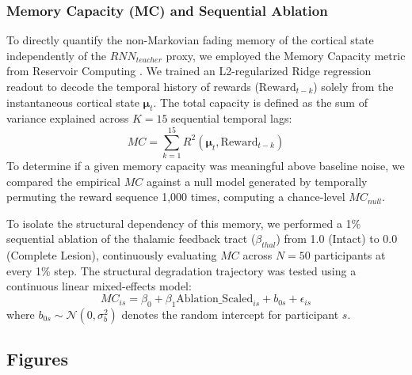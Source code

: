 \documentclass[12pt, a4paper]{extarticle}
\begin{document}
\subsubsection{Memory Capacity (MC) and Sequential Ablation}
To directly quantify the non-Markovian fading memory of the cortical state independently of the $RNN_{teacher}$ proxy, we employed the Memory Capacity metric from Reservoir Computing \parencite{jaeger2002}. We trained an L2-regularized Ridge regression readout to decode the temporal history of rewards ($\text{Reward}_{t-k}$) solely from the instantaneous cortical state $\boldsymbol{\mu}_t$. The total capacity is defined as the sum of variance explained across $K=15$ sequential temporal lags:
\begin{equation}
	MC = \sum_{k=1}^{15} R^2(\boldsymbol{\mu}_t, \text{Reward}_{t-k})
\end{equation}
To determine if a given memory capacity was meaningful above baseline noise, we compared the empirical $MC$ against a null model generated by temporally permuting the reward sequence 1,000 times, computing a chance-level $MC_{null}$.

To isolate the structural dependency of this memory, we performed a 1\% sequential ablation of the thalamic feedback tract ($\beta_{thal}$) from 1.0 (Intact) to 0.0 (Complete Lesion), continuously evaluating $MC$ across $N=50$ participants at every 1\% step. The structural degradation trajectory was tested using a continuous linear mixed-effects model:
\begin{equation}
	MC_{is} = \beta_0 + \beta_1 \mathrm{Ablation\_Scaled}_{is} + b_{0s} + \epsilon_{is}
\end{equation}
where $b_{0s} \sim \mathcal{N}(0, \sigma_b^2)$ denotes the random intercept for participant $s$.

\subsection{Figures}
	
	\clearpage
	\printbibliography
\end{document}
